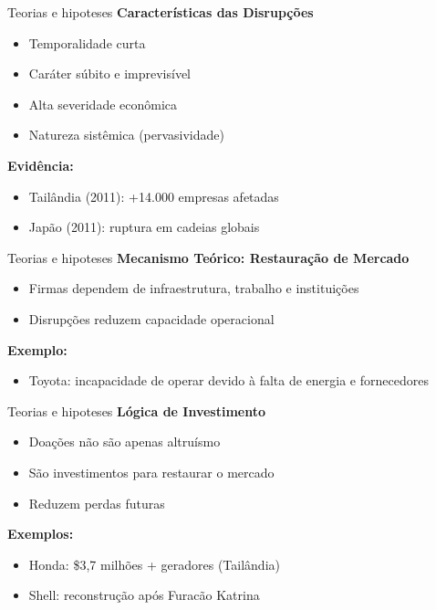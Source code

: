 \documentclass[
  10pt,
  ignorenonframetext,
  aspectratio=169,
  brazilian,
]{beamer}
\providecommand{\tightlist}{%
  \setlength{\itemsep}{0pt}\setlength{\parskip}{0pt}}
\begin{document}
\begin{frame}{Teorias e hipoteses}
\label{teorias-e-hipoteses-3}
\textbf{Características das Disrupções}

\begin{itemize}
\tightlist
\item
  Temporalidade curta
\item
  Caráter súbito e imprevisível
\item
  Alta severidade econômica
\item
  Natureza sistêmica (pervasividade)
\end{itemize}

\textbf{Evidência:}

\begin{itemize}
\tightlist
\item
  Tailândia (2011): +14.000 empresas afetadas
\item
  Japão (2011): ruptura em cadeias globais
\end{itemize}
\end{frame}

\begin{frame}{Teorias e hipoteses}
\label{teorias-e-hipoteses-4}
\textbf{Mecanismo Teórico: Restauração de Mercado}

\begin{itemize}
\tightlist
\item
  Firmas dependem de infraestrutura, trabalho e instituições
\item
  Disrupções reduzem capacidade operacional
\end{itemize}

\textbf{Exemplo:}

\begin{itemize}
\tightlist
\item
  Toyota: incapacidade de operar devido à falta de energia e
  fornecedores
\end{itemize}
\end{frame}

\begin{frame}{Teorias e hipoteses}
\label{teorias-e-hipoteses-5}
\textbf{Lógica de Investimento}

\begin{itemize}
\tightlist
\item
  Doações não são apenas altruísmo
\item
  São investimentos para restaurar o mercado
\item
  Reduzem perdas futuras
\end{itemize}

\textbf{Exemplos:}

\begin{itemize}
\tightlist
\item
  Honda: \$3,7 milhões + geradores (Tailândia)
\item
  Shell: reconstrução após Furacão Katrina
\end{itemize}
\end{frame}
\end{document}
